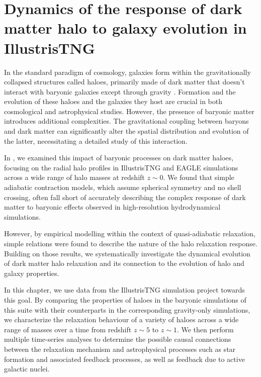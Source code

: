 \chapter{Dynamics of the response of dark matter halo to galaxy evolution in IllustrisTNG}
\label{chap:dynam-relxn}


In the standard paradigm of cosmology, galaxies form within the gravitationally collapsed structures called haloes, primarily made of dark matter that doesn't interact with baryonic galaxies except through gravity \citep[][]{wr78}. Formation and the evolution of these haloes and the galaxies they host are crucial in both cosmological and astrophysical studies. However, the presence of baryonic matter introduces additional complexities. The gravitational coupling between baryons and dark matter can significantly alter the spatial distribution and evolution of the latter, necessitating a detailed study of this interaction. 

In , we examined this impact of baryonic processes on dark matter haloes, focusing on the radial halo profiles in IllustrisTNG and EAGLE simulations across a wide range of halo masses at redshift $z \sim 0$. We found that simple adiabatic contraction models, which assume spherical symmetry and no shell crossing, often fall short of accurately describing the complex response of dark matter to baryonic effects observed in high-resolution hydrodynamical simulations.

However, by empirical modelling within the context of quasi-adiabatic relaxation, simple relations were found to describe the nature of the halo relaxation response. Building on those results, we systematically investigate the dynamical evolution of dark matter halo relaxation and its connection to the evolution of halo and galaxy properties. 

In this chapter, we use data from the IllustrisTNG simulation project towards this goal. By comparing the properties of haloes in the baryonic simulations of this suite with their counterparts in the corresponding gravity-only simulations, we characterize the relaxation behaviour of a variety of haloes across a wide range of masses over a time from redshift $z \sim 5$ to $z \sim 1$. We then perform multiple time-series analyses to determine the possible causal connections between the relaxation mechanism and astrophysical processes such as star formation and associated feedback processes, as well as feedback due to active galactic nuclei.

